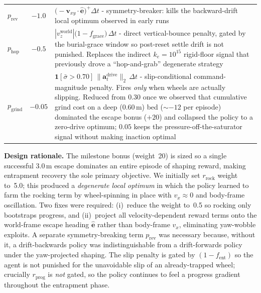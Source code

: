 \documentclass[conference]{IEEEtran}
\begin{document}
\begin{table}[!htbp]
\begin{tabular}{@{}lcp{4.0cm}@{}}
    $p_{\text{rev}}$
      & $-1.0$
      & $\bigl(\!-\!\mathbf{v}_{xy}\!\cdot\!\hat{\mathbf{e}}\bigr)^+\!\Delta t$ -
        symmetry-breaker: kills the backward-drift local optimum observed in
        early runs \\[2pt]
    $p_{\text{hop}}$
      & $-0.5$
      & $|v_z^\text{world}|\bigl(1{-}f_\text{grace}\bigr)\,\Delta t$ -
        direct vertical-bounce penalty, gated by the burial-grace window so
        post-reset settle drift is not punished. Replaces the indirect
        $k_e{=}10^{15}$ rigid-floor signal that previously drove a
        ``hop-and-grab'' degenerate strategy \\[2pt]
    $p_{\text{grind}}$
      & $-0.05$
      & $\mathbf{1}[\bar{\sigma}{>}0.70]\,\|\mathbf{a}_t^{\text{drive}}\|_2\,\Delta t$
        - slip-conditional command-magnitude penalty. Fires \emph{only}
        when wheels are actually slipping. Reduced from $0.30$ once we
        observed that cumulative grind cost on a deep ($0.60$\,m) bed
        ($\sim{-}12$ per episode) dominated the escape bonus ($+20$) and
        collapsed the policy to a zero-drive optimum; $0.05$ keeps the
        pressure-off-the-saturator signal without making inaction optimal \\
    \bottomrule
  \end{tabular}
\end{table}

\textbf{Design rationale.}
The milestone bonus (weight~20) is sized so a single successful 3.0\,m escape
dominates an entire episode of shaping reward, making entrapment recovery the
sole primary objective. We initially set $r_\text{rock}$ weight to~5.0; this
produced a \emph{degenerate local optimum} in which the policy learned to farm
the rocking term by wheel-spinning in place with $v_x \approx 0$ and body-frame
oscillation. Two fixes were required: (i)~reduce the weight to~0.5 so rocking
only bootstraps progress, and (ii)~project all velocity-dependent reward terms
onto the world-frame escape heading $\hat{\mathbf{e}}$ rather than body-frame
$v_x$, eliminating yaw-wobble exploits. A separate symmetry-breaking term
$p_\text{rev}$ was necessary because, without it, a drift-backwards policy was
indistinguishable from a drift-forwards policy under the yaw-projected
shaping. The slip penalty is gated by $(1{-}f_\text{ent})$ so the agent is not
punished for the unavoidable slip of an already-trapped wheel; crucially
$r_\text{prog}$ is \emph{not} gated, so the policy continues to feel a
progress gradient throughout the entrapment phase.
\end{document}
